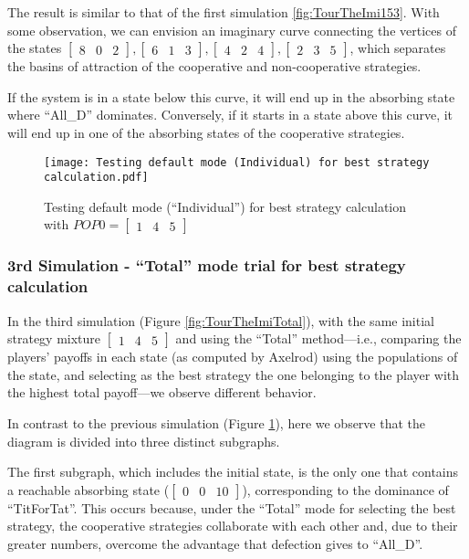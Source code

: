 The result is similar to that of the first simulation \ref{fig:TourTheImi153}. With some observation, we can envision an imaginary curve connecting the vertices of the states $\begin{bmatrix}8 & 0 & 2\end{bmatrix}, \begin{bmatrix}6 & 1 & 3\end{bmatrix}, \begin{bmatrix}4 & 2 & 4\end{bmatrix}, \begin{bmatrix}2 & 3 & 5\end{bmatrix}$, which separates the basins of attraction of the cooperative and non-cooperative strategies. 

If the system is in a state below this curve, it will end up in the absorbing state where ``All\_D'' dominates. Conversely, if it starts in a state above this curve, it will end up in one of the absorbing states of the cooperative strategies.

	\begin{figure}[h]
	      \centering
	      \texttt{[image: Testing default mode (Individual) for best strategy calculation.pdf]}
	      \caption{Testing default mode (``Individual'') for best strategy calculation with $POP0=\begin{bmatrix}1&4&5\end{bmatrix}$}
	      \label{fig:TourTheImiIndividual}
	\end{figure}
\subsubsection{3rd Simulation - ``Total'' mode trial for best strategy calculation}
In the third simulation (Figure \ref{fig:TourTheImiTotal}), with the same initial strategy mixture $\begin{bmatrix}1 & 4 & 5\end{bmatrix}$ and using the ``Total'' method—i.e., comparing the players' payoffs in each state (as computed by Axelrod) using the populations of the state, and selecting as the best strategy the one belonging to the player with the highest total payoff—we observe different behavior.

In contrast to the previous simulation (Figure \ref{fig:TourTheImiIndividual}), here we observe that the diagram is divided into three distinct subgraphs.

The first subgraph, which includes the initial state, is the only one that contains a reachable absorbing state ($\begin{bmatrix}0 & 0 & 10\end{bmatrix}$), corresponding to the dominance of ``TitForTat''. This occurs because, under the ``Total'' mode for selecting the best strategy, the cooperative strategies collaborate with each other and, due to their greater numbers, overcome the advantage that defection gives to ``All\_D''.

